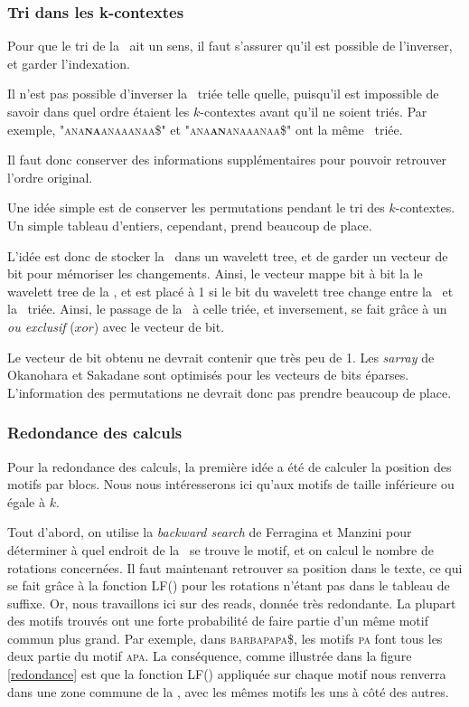 \subsubsection{Tri dans les k-contextes}
Pour que le tri de la \kbwt\ ait un sens, il faut s'assurer qu'il est possible de l'inverser, et garder l'indexation.

Il n'est pas possible d'inverser la \kbwt\ triée telle quelle, puisqu'il est impossible de savoir dans quel ordre étaient les $k$-contextes avant qu'il ne soient triés. Par exemple, \textsc{"ana\textbf{na}anaaanaa\$"} et \textsc{"ana\textbf{an}anaaanaa\$"} ont la même \kbwt\ triée.

Il faut donc conserver des informations supplémentaires pour pouvoir retrouver l'ordre original.

Une idée simple est de conserver les permutations pendant le tri des $k$-contextes. Un simple tableau d'entiers, cependant, prend beaucoup de place.

L'idée est donc de stocker la \kbwt\ dans un wavelett tree, et de garder un vecteur de bit pour mémoriser les changements. Ainsi, le vecteur mappe bit à bit la le wavelett tree de la \kbwt, et est placé à 1 si le bit du wavelett tree change entre la \kbwt\ et la \kbwt\ triée. Ainsi, le passage de la \kbwt\ à celle triée, et inversement, se fait grâce à un \textit{ou exclusif} ($xor$) avec le vecteur de bit.

Le vecteur de bit obtenu ne devrait contenir que très peu de 1. Les \textit{sarray} de Okanohara et Sakadane sont optimisés pour les vecteurs de bits éparses. L'information des permutations ne devrait donc pas prendre beaucoup de place.


\subsubsection{Redondance des calculs}
Pour la redondance des calculs, la première idée a été de calculer la position des motifs par blocs. Nous nous intéresserons ici qu'aux motifs de taille inférieure ou égale à $k$. 

Tout d'abord, on utilise la \textit{backward search} de Ferragina et Manzini pour déterminer à quel endroit de la \kbwt\ se trouve le motif, et on calcul le nombre de rotations concernées. Il faut maintenant retrouver sa position dans le texte, ce qui se fait grâce à la fonction LF() pour les rotations n'étant pas dans le tableau de suffixe. Or, nous travaillons ici sur des reads, donnée très redondante. La plupart des motifs trouvés ont une forte probabilité de faire partie d'un même motif commun plus grand. Par exemple, dans \textsc{barbapapa\$}, les motifs \textsc{pa} font tous les deux partie du motif \textsc{apa}. La conséquence, comme illustrée dans la figure \ref{redondance} est que la fonction LF() appliquée sur chaque motif nous renverra dans une zone commune de la \kbwt, avec les mêmes motifs les uns à côté des autres. 

